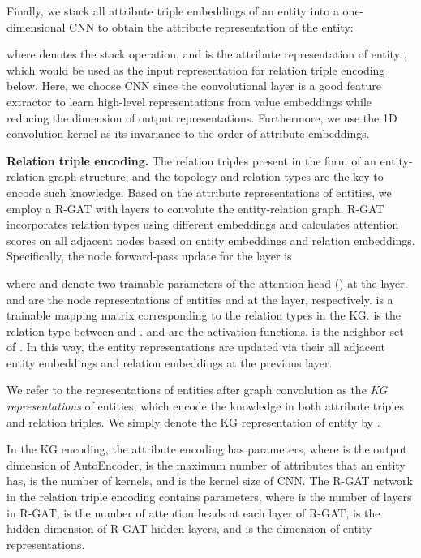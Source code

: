 \documentclass[runningheads]{llncs}
\begin{document}
Finally, we stack all attribute triple embeddings of an entity into a one-dimensional CNN to obtain the attribute representation of the entity:

where  denotes the stack operation, and  is the attribute representation of entity , which would be used as the input representation for relation triple encoding below. Here, we choose CNN since the convolutional layer is a good feature extractor to learn high-level representations from value embeddings while reducing the dimension of output representations. 
Furthermore, we use the 1D convolution kernel as its invariance to the order of attribute embeddings. 

\textbf{Relation triple encoding.}
The relation triples present in the form of an entity-relation graph structure, and the topology and relation types are the key to encode such knowledge.
Based on the attribute representations of entities, we employ a R-GAT \cite{busbrige2019relational} with  layers to convolute the entity-relation graph. 
R-GAT incorporates relation types using different embeddings and calculates attention scores on all adjacent nodes based on entity embeddings and relation embeddings.
Specifically, the node forward-pass update for the  layer is

where  and  denote two trainable parameters of the  attention head () at the  layer. 
 and  are the node representations of entities  and  at the  layer, respectively. 
 is a trainable mapping matrix corresponding to the relation types in the KG. 
 is the relation type between  and . 
 and  are the activation functions. 
 is the neighbor set of . In this way, the entity representations are updated via their all adjacent entity embeddings and relation embeddings at the previous layer.

We refer to the representations of entities after graph convolution as the \emph{KG representations} of entities, which encode the knowledge in both attribute triples and relation triples. 
We simply denote the KG representation of entity  by .

In the KG encoding, the attribute encoding has  parameters, where  is the output dimension of AutoEncoder,  is the maximum number of attributes that an entity has,  is the number of kernels, and  is the kernel size of CNN. 
The R-GAT network in the relation triple encoding contains  parameters, where  is the number of layers in R-GAT,  is the number of attention heads at each layer of R-GAT,  is the hidden dimension of R-GAT hidden layers, and  is the dimension of entity representations.
\end{document}
